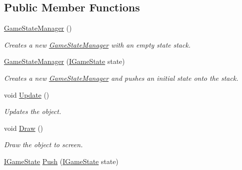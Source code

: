 \subsection*{Public Member Functions}
\begin{DoxyCompactItemize}
\item 
\hyperlink{class_tri_devs_1_1_tri_engine2_d_1_1_state_management_1_1_game_state_manager_a8a8138acfb1b983cc2661cafc52df3c7}{Game\-State\-Manager} ()
\begin{DoxyCompactList}\small\item\em Creates a new \hyperlink{class_tri_devs_1_1_tri_engine2_d_1_1_state_management_1_1_game_state_manager}{Game\-State\-Manager} with an empty state stack. \end{DoxyCompactList}\item 
\hyperlink{class_tri_devs_1_1_tri_engine2_d_1_1_state_management_1_1_game_state_manager_a3e9e99043a216b0bdb8544b64a72e154}{Game\-State\-Manager} (\hyperlink{interface_tri_devs_1_1_tri_engine2_d_1_1_state_management_1_1_i_game_state}{I\-Game\-State} state)
\begin{DoxyCompactList}\small\item\em Creates a new \hyperlink{class_tri_devs_1_1_tri_engine2_d_1_1_state_management_1_1_game_state_manager}{Game\-State\-Manager} and pushes an initial state onto the stack. \end{DoxyCompactList}\item 
void \hyperlink{class_tri_devs_1_1_tri_engine2_d_1_1_state_management_1_1_game_state_manager_ab983ca2818bff5c3bd7cf0cc342d0d4c}{Update} ()
\begin{DoxyCompactList}\small\item\em Updates the object. \end{DoxyCompactList}\item 
void \hyperlink{class_tri_devs_1_1_tri_engine2_d_1_1_state_management_1_1_game_state_manager_a2d30555c64bf3337e1b6a328abde489e}{Draw} ()
\begin{DoxyCompactList}\small\item\em Draw the object to screen. \end{DoxyCompactList}\item 
\hyperlink{interface_tri_devs_1_1_tri_engine2_d_1_1_state_management_1_1_i_game_state}{I\-Game\-State} \hyperlink{class_tri_devs_1_1_tri_engine2_d_1_1_state_management_1_1_game_state_manager_a8b1004837f558a3ab31dd6597f31d2f1}{Push} (\hyperlink{interface_tri_devs_1_1_tri_engine2_d_1_1_state_management_1_1_i_game_state}{I\-Game\-State} state)

\end{DoxyCompactItemize}

